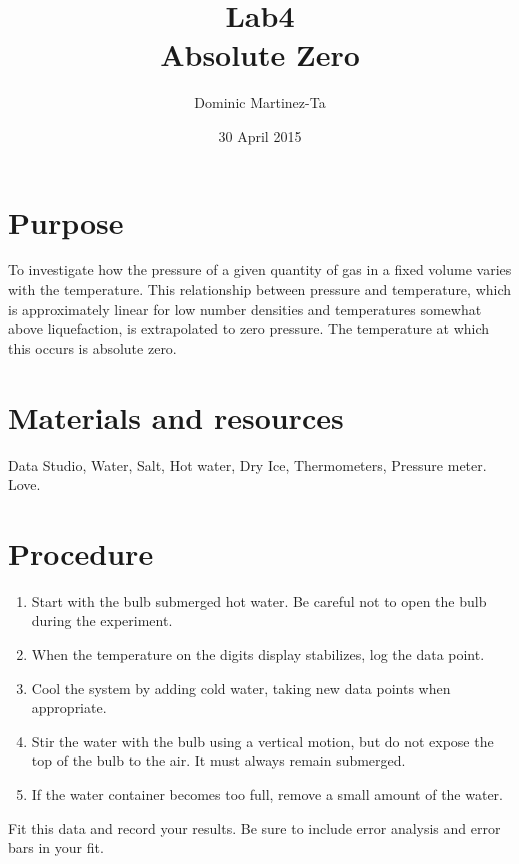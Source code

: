 \documentclass[12pt]{report}
\begin{document}
\title{Lab4 \\ Absolute Zero}
\author{Dominic Martinez-Ta}
\date{30 April 2015}
\maketitle


\section{Purpose}
	
	To investigate how the pressure of a given quantity of gas in a fixed volume varies with
the temperature. This relationship between pressure and temperature, which is approximately
linear for low number densities and temperatures somewhat above liquefaction, is
extrapolated to zero pressure. The temperature at which this occurs is absolute zero.

\section {Materials and resources}

Data Studio, Water, Salt, Hot water, Dry Ice, Thermometers, Pressure meter. Love.

\section{Procedure}
	\begin{enumerate}
		\item  Start with the bulb submerged hot water. Be careful not to open the bulb during the experiment.
		\item When the temperature on the digits display stabilizes, log the data point.
		\item Cool the system by adding cold water, taking new data points when appropriate.
		\item Stir the water with the bulb using a vertical motion, but do not expose the top of the bulb to the air. It must always remain submerged.
		\item  If the water container becomes too full, remove a small amount of the water.
	\end{enumerate}
	Fit this data and record your results. Be sure to include error analysis and error bars in your fit.
\end{document}
